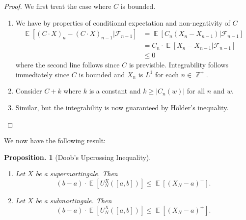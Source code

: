 \documentclass[11pt, a4paper]{memoir}
\DeclareMathOperator{\Z}{{\mathbb{Z}}}
\theoremstyle{change}
\newtheorem{proposition}[theorem]{Proposition.}
\theoremstyle{plain}
\theoremstyle{nonumberplain}
\newtheorem{proof}{Proof}
\DeclareMathOperator{\E}{{\mathbb{E}}}
\numberwithin{equation}{section}
\begin{document}
\begin{proof}
    We first treat the case where $C$ is bounded.
    \begin{enumerate}[nl,r]
        \item We have by properties of conditional expectation and non-negativity of $C$
            \begin{align*}
                \E[(C\cdot X)_n-(C\cdot X)_{n-1}|\mathcal{F}_{n-1}] &= \E[C_n(X_n-X_{n-1})|\mathcal{F}_{n-1}]\\
                                                                    &= C_n\cdot \E[X_n-X_{n-1}|\mathcal{F}_{n-1}]\\
                                                                    &\leq 0
            \end{align*}
            where the second line follows since $C$ is previsible.
            Integrability follows immediately since $C$ is bounded and $X_n$ is $L^1$ for each $n\in\Z^+$.
        \item Consider $C+k$ where $k$ is a constant and $k\geq|C_n(w)|$ for all $n$ and $w$.
        \item Similar, but the integrability is now guaranteed by Hölder's inequality.
    \end{enumerate}
\end{proof}
We now have the following result:
\begin{proposition}[Doob's Upcrossing Inequality]
    \begin{enumerate}[nl,r]
        \item Let $X$ be a supermartingale.
            Then
            \begin{equation*}
                (b-a)\cdot\E[U_N^X([a,b])]\leq\E[(X_N-a)^-].
            \end{equation*}
        \item Let $X$ be a submartingale.
            Then
            \begin{equation*}
                (b-a)\cdot\E[U_N^X([a,b])]\leq\E[(X_N-a)^+].
            \end{equation*}
    \end{enumerate}
\end{proposition}
\end{document}
